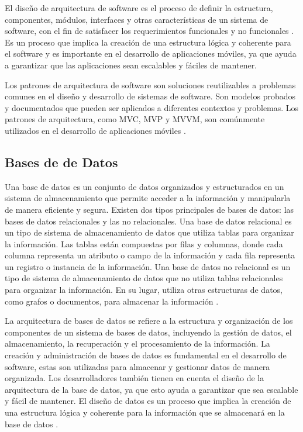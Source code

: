 \documentclass[runningheads]{llncs}
\begin{document}
El diseño de arquitectura de software es el proceso de definir la estructura, componentes, módulos, interfaces y otras características de un sistema de software, con el fin de satisfacer los requerimientos funcionales y no funcionales \cite{Cita9,Cita11}. Es un proceso que implica la creación de una estructura lógica y coherente para el software y es importante en el desarrollo de aplicaciones móviles, ya que ayuda a garantizar que las aplicaciones sean escalables y fáciles de mantener.

Los patrones de arquitectura de software son soluciones reutilizables a problemas comunes en el diseño y desarrollo de sistemas de software. Son modelos probados y documentados que pueden ser aplicados a diferentes contextos y problemas. Los patrones de arquitectura, como MVC, MVP y MVVM, son comúnmente utilizados en el desarrollo de aplicaciones móviles \cite{Cita11}. 

\subsection{Bases de de Datos}
Una base de datos es un conjunto de datos organizados y estructurados en un sistema de almacenamiento que permite acceder a la información y manipularla de manera eficiente y segura. Existen dos tipos principales de bases de datos: las bases de datos relacionales y las no relacionales. Una base de datos relacional es un tipo de sistema de almacenamiento de datos que utiliza tablas para organizar la información. Las tablas están compuestas por filas y columnas, donde cada columna representa un atributo o campo de la información y cada fila representa un registro o instancia de la información. Una base de datos no relacional es un tipo de sistema de almacenamiento de datos que no utiliza tablas relacionales para organizar la información. En su lugar, utiliza otras estructuras de datos, como grafos o documentos, para almacenar la información \cite{Cita12}.

La arquitectura de bases de datos se refiere a la estructura y organización de los componentes de un sistema de bases de datos, incluyendo la gestión de datos, el almacenamiento, la recuperación y el procesamiento de la información. La creación y administración de bases de datos es fundamental en el desarrollo de software, estas son utilizadas para almacenar y gestionar datos de manera organizada. Los desarrolladores también tienen en cuenta el diseño de la arquitectura de la base de datos, ya que esto ayuda a garantizar que sea escalable y fácil de mantener. El diseño de datos es un proceso que implica la creación de una estructura lógica y coherente para la información que se almacenará en la base de datos \cite{Cita13}. 
\end{document}
